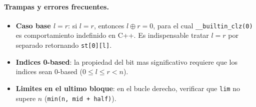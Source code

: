 \paragraph{Trampas y errores frecuentes.}
\begin{itemize}\setlength\itemsep{0pt}
	\item \textbf{Caso base $l = r$}: si $l = r$, entonces $l \oplus r = 0$, para el cual \verb|__builtin_clz(0)| es comportamiento indefinido en C++. Es indispensable tratar $l = r$ por separado retornando \texttt{st[0][l]}.
	\item \textbf{Indices 0-based}: la propiedad del bit mas significativo requiere que los indices sean 0-based ($0 \le l \le r < n$).
	\item \textbf{Limites en el ultimo bloque}: en el bucle derecho, verificar que \texttt{lim} no supere $n$ (\texttt{min(n, mid + half)}).
\end{itemize}

